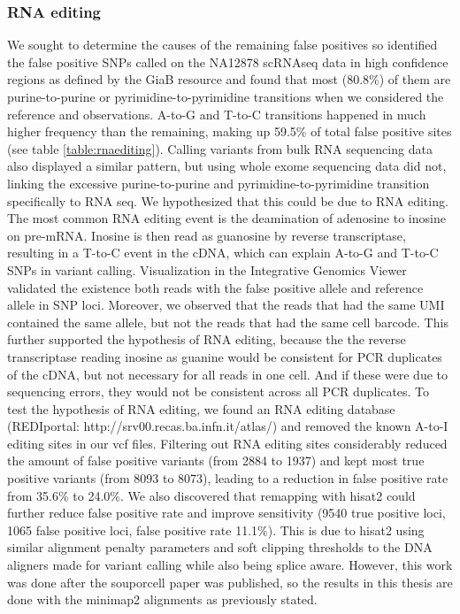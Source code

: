 \subsubsection{RNA editing}
\par{
We sought to determine the causes of the remaining false positives so identified the false positive SNPs called on the NA12878 scRNAseq data in high confidence regions as defined by the GiaB resource and found that most (80.8\%) of them are purine-to-purine or pyrimidine-to-pyrimidine transitions when we considered the reference and observations. A-to-G and T-to-C transitions happened in much higher frequency than the remaining, making up 59.5\% of
total false positive sites (see table \ref{table:rnaediting}). Calling variants from bulk RNA sequencing data also
displayed a similar pattern, but using whole exome sequencing data did not, linking the
excessive purine-to-purine and pyrimidine-to-pyrimidine transition specifically to RNA seq. We hypothesized that this could be due to RNA editing. The most common RNA editing event is the
deamination of adenosine to inosine on pre-mRNA\cite{atoi}. Inosine is then read as guanosine by
reverse transcriptase, resulting in a T-to-C event in the cDNA, which can explain A-to-G and T-to-C SNPs in variant calling. Visualization in the Integrative Genomics Viewer\cite{IGV} validated the
existence both reads with the false positive allele and reference allele in SNP loci. Moreover, we observed
that the reads that had the same UMI contained the same allele, but not the reads that had
the same cell barcode. This further supported the hypothesis of RNA editing, because the the reverse transcriptase reading inosine as guanine would be consistent for PCR duplicates of the cDNA, but
not necessary for all reads in one cell. And if these were due to sequencing errors, they would not be consistent across all PCR duplicates. To test the hypothesis of RNA editing, we found an RNA editing database (REDIportal\cite{rnaediting}: http://srv00.recas.ba.infn.it/atlas/) and removed the known A-to-I editing sites in our vcf files.
Filtering out RNA editing sites considerably reduced the amount of false positive variants (from
2884 to 1937) and kept most true positive variants (from 8093 to 8073), leading to a reduction
in false positive rate from 35.6\% to 24.0\%. We also discovered that remapping with hisat2
could further reduce false positive rate and improve sensitivity (9540 true positive loci, 1065
false positive loci, false positive rate 11.1\%). This is due to hisat2 using similar alignment penalty parameters and soft clipping thresholds to the DNA aligners made for variant calling while also being splice aware. However, this work was done after the souporcell paper was published, so the results in this thesis are done with the minimap2 alignments as previously stated.
}

